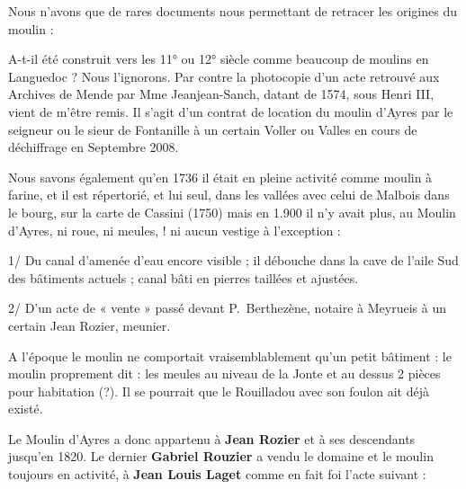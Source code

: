 \vspace{0.55cm}

Nous n’avons que de rares documents nous permettant de retracer les origines du moulin :

\vspace{0.35cm}

A-t-il été construit vers les 11° ou 12° siècle comme beaucoup de moulins en Languedoc ?
Nous l’ignorons. Par contre la photocopie d’un acte retrouvé aux Archives de Mende par
Mme Jeanjean-Sanch, datant de 1574, sous Henri III, vient de m’être remis. Il s’agit d’un
contrat de location du moulin d’Ayres par le seigneur ou le sieur de Fontanille à un certain
Voller ou Valles en cours de déchiffrage en Septembre 2008.

\vspace{0.35cm}

Nous savons également qu’en 1736 il était en pleine activité comme moulin à farine, et il est
répertorié, et lui seul, dans les vallées avec celui de Malbois dans le bourg, sur la carte de
Cassini (1750) mais en 1.900 il n’y avait plus, au Moulin d’Ayres, ni roue, ni meules, !
ni aucun vestige à l’exception :

\vspace{0.3cm}

1/ Du canal d’amenée d’eau encore visible ; il débouche dans la cave de l’aile Sud des
bâtiments actuels ; canal bâti en pierres taillées et ajustées.

\vspace{0.3cm}

2/ D’un acte de « vente » passé devant P.~Berthezène, notaire à Meyrueis à un certain Jean
Rozier, meunier.

\vspace{0.35cm}

A l’époque le moulin ne comportait vraisemblablement qu’un petit bâtiment : le moulin
proprement dit : les meules au niveau de la Jonte et au dessus 2 pièces pour habitation (?).
Il se pourrait que le Rouilladou avec son foulon ait déjà existé.

\vspace{0.35cm}

Le Moulin d’Ayres a donc appartenu à \textbf{Jean Rozier} et à ses descendants jusqu’en 1820.
Le dernier \textbf{Gabriel Rouzier} a vendu le domaine et le moulin toujours en activité, à \textbf{Jean
Louis Laget} comme en fait foi l’acte suivant :

\vspace{0.25cm}

